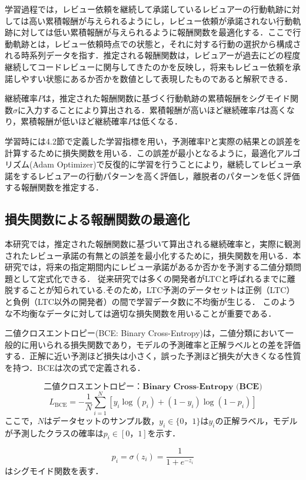 \documentclass[11pt]{jreport}
\begin{document}
学習過程では，レビュー依頼を継続して承諾しているレビュアーの行動軌跡に対しては高い累積報酬が与えられるようにし，レビュー依頼が承諾されない行動軌跡に対しては低い累積報酬が与えられるように報酬関数を最適化する．ここで行動軌跡とは，レビュー依頼時点での状態と，それに対する行動の選択から構成される時系列データを指す．推定される報酬関数は，レビュアーが過去にどの程度継続してコードレビューに関与してきたのかを反映し，将来もレビュー依頼を承諾しやすい状態にあるか否かを数値として表現したものであると解釈できる．

継続確率$P$は，推定された報酬関数に基づく行動軌跡の累積報酬をシグモイド関数$\sigma$に入力することにより算出される．累積報酬が高いほど継続確率$P$は高くなり，累積報酬が低いほど継続確率$P$は低くなる．

学習時には4.2節で定義した学習指標を用い，予測確率Pと実際の結果との誤差を計算するために損失関数を用いる．この誤差が最小となるように，最適化アルゴリズム(Adam Optimizer)で反復的に学習を行うことにより，継続してレビュー承諾をするレビュアーの行動パターンを高く評価し，離脱者のパターンを低く評価する報酬関数を推定する．

\subsection{損失関数による報酬関数の最適化}

本研究では，推定された報酬関数に基づいて算出される継続確率と，実際に観測されたレビュー承諾の有無との誤差を最小化するために，損失関数を用いる．本研究では，将来の指定期間内にレビュー承諾があるか否かを予測する二値分類問題として定式化できる．
従来研究では多くの開発者がLTCと呼ばれるまでに離脱することが知られている\cite{OTC}.そのため，LTC予測のデータセットは正例（LTC）と負例（LTC以外の開発者）の間で学習データ数に不均衡が生じる．
このような不均衡なデータに対しては適切な損失関数を用いることが重要である．

二値クロスエントロピー(BCE: Binary Cross-Entropy)は，二値分類において一般的に用いられる損失関数であり，モデルの予測確率と正解ラベルとの差を評価する．正解に近い予測ほど損失は小さく，誤った予測ほど損失が大きくなる性質を持つ．BCEは次の式で定義される\cite{BCE-FocalLoss}．

\[\textbf{二値クロスエントロピー：Binary Cross-Entropy (BCE)}\]
\[
L_{\mathrm{BCE}} = - \frac{1}{N} \sum_{i=1}^{N} \left[ y_i\log(p_i) + (1 - y_i)\log(1 - p_i)\right]
\]
ここで，$N$はデータセットのサンプル数，$y_i \in \{0，1\}$は$y_i$の正解ラベル，モデルが予測したクラスの確率は$p_i \in [0，1]$を示す．

\[p_i = \sigma(z_i) = \frac{1}{1 + e^{-z_i}}\]はシグモイド関数を表す．
\end{document}
